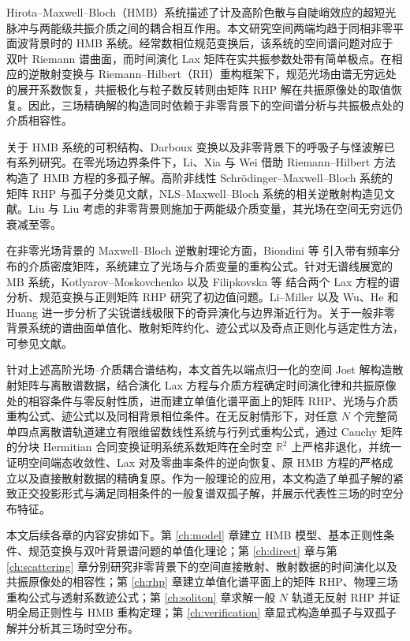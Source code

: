
Hirota--Maxwell--Bloch（HMB）系统描述了计及高阶色散与自陡峭效应的超短光脉冲与两能级共振介质之间的耦合相互作用\cite{PN1995,LHP2013}。本文研究空间两端均趋于同相非零平面波背景时的 HMB 系统。经常数相位规范变换后，该系统的空间谱问题对应于双叶 Riemann 谱曲面，而时间演化 Lax 矩阵在实共振参数处带有简单极点。在相应的逆散射变换与 Riemann--Hilbert（RH）重构框架下，规范光场由谱无穷远处的展开系数恢复，共振极化与粒子数反转则由矩阵 RHP 解在共振原像处的取值恢复。因此，三场精确解的构造同时依赖于非零背景下的空间谱分析与共振极点处的介质相容性。

关于 HMB 系统的可积结构、Darboux 变换以及非零背景下的呼吸子与怪波解已有系列研究\cite{LHP2013,ZZ2026}。在零光场边界条件下，Li、Xia 与 Wei\cite{LXW2021} 借助 Riemann--Hilbert 方法构造了 HMB 方程的多孤子解。高阶非线性 Schr\"odinger--Maxwell--Bloch 系统的矩阵 RHP 与孤子分类见文献\cite{LTPY2020,Guo2022}，NLS--Maxwell--Bloch 系统的相关逆散射构造见文献\cite{LZX2021}。Liu 与 Liu\cite{LL2026} 考虑的非零背景则施加于两能级介质变量，其光场在空间无穷远仍衰减至零。

在非零光场背景的 Maxwell--Bloch 逆散射理论方面，Biondini 等\cite{BGKL2019} 引入带有频率分布的介质密度矩阵，系统建立了光场与介质变量的重构公式。针对无谱线展宽的 MB 系统，Kotlyarov--Moskovchenko\cite{KM2014} 以及 Filipkovska 等\cite{FKM2017} 结合两个 Lax 方程的谱分析、规范变换与正则矩阵 RHP 研究了初边值问题。Li--Miller\cite{LM2024} 以及 Wu、He 和 Huang\cite{WHH2025} 进一步分析了尖锐谱线极限下的奇异演化与边界渐近行为。关于一般非零背景系统的谱曲面单值化、散射矩阵约化、迹公式以及奇点正则化与适定性方法，可参见文献\cite{Fan2022,ZhangFan2020,ZCY2020,BM2019,BPZ2024}。

针对上述高阶光场--介质耦合谱结构，本文首先以端点归一化的空间 Jost 解构造散射矩阵与离散谱数据，结合演化 Lax 方程与介质方程确定时间演化律和共振原像处的相容条件与零反射性质，进而建立单值化谱平面上的矩阵 RHP、光场与介质重构公式、迹公式以及同相背景相位条件。在无反射情形下，对任意 $N$ 个完整简单四点离散谱轨道建立有限维留数线性系统与行列式重构公式，通过 Cauchy 矩阵的分块 Hermitian 合同变换证明系统系数矩阵在全时空 $\mathbb R^2$ 上严格非退化，并统一证明空间端态收敛性、Lax 对及零曲率条件的逆向恢复、原 HMB 方程的严格成立以及直接散射数据的精确复原。作为一般理论的应用，本文构造了单孤子解的紧致正交投影形式与满足同相条件的一般复谱双孤子解，并展示代表性三场的时空分布特征。

本文后续各章的内容安排如下。第 \ref{ch:model} 章建立 HMB 模型、基本正则性条件、规范变换与双叶背景谱问题的单值化理论；第 \ref{ch:direct} 章与第 \ref{ch:scattering} 章分别研究非零背景下的空间直接散射、散射数据的时间演化以及共振原像处的相容性；第 \ref{ch:rhp} 章建立单值化谱平面上的矩阵 RHP、物理三场重构公式与透射系数迹公式；第 \ref{ch:soliton} 章求解一般 $N$ 轨道无反射 RHP 并证明全局正则性与 HMB 重构定理；第 \ref{ch:verification} 章显式构造单孤子与双孤子解并分析其三场时空分布。
